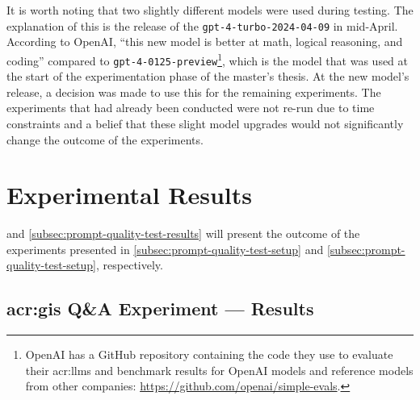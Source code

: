 It is worth noting that two slightly different models were used during testing. The explanation of this is the release of the \texttt{gpt-4-turbo-2024-04-09} in mid-April. According to OpenAI, \enquote{this new model is better at math, logical reasoning, and coding} compared to \texttt{gpt-4-0125-preview}\footnote{OpenAI has a GitHub repository containing the code they use to evaluate their \glspl{acr:llm} and benchmark results for OpenAI models and reference models from other companies: \url{https://github.com/openai/simple-evals}.}, which is the model that was used at the start of the experimentation phase of the master's thesis. At the new model's release, a decision was made to use this for the remaining experiments. The experiments that had already been conducted were not re-run due to time constraints and a belief that these slight model upgrades would not significantly change the outcome of the experiments.


\section{Experimental Results}
\label{sec:experimental-results}

\begin{comment}
Results should be clearly displayed and should provide a suitable representation of your results for the points you wish to make.
Graphs should be labelled in a legible font. If more than one result is displayed in the same graph, then these should be clearly marked.
Please choose carefully rather than presenting every result. Too much information is hard to read and often hides the key information you wish to present. Make use of statistical methods when presenting results, where possible to strengthen the results.
Further, the format of the presentation of results should be chosen based on what issues in the results you wish to highlight.
You may wish to present a subset in the experimental section and provide additional results in an appendix.
Point out specifics here but save the overall/general discussion to the Discussion chapter.
\end{comment}

 and \autoref{subsec:prompt-quality-test-results} will present the outcome of the experiments presented in \autoref{subsec:prompt-quality-test-setup} and \autoref{subsec:prompt-quality-test-setup}, respectively.


\subsection[GIS Q\&A Experiment --- Results]{\acrshort{acr:gis} Q\&A Experiment --- Results}
\label{subsec:quantitative-results}

